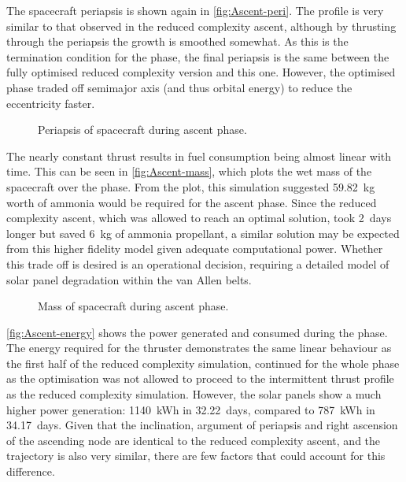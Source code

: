 The spacecraft periapsis is shown again in \autoref{fig:Ascent-peri}. The profile is very similar to that observed in the reduced complexity ascent, although by thrusting through the periapsis the growth is smoothed somewhat. As this is the termination condition for the phase, the final periapsis is the same between the fully optimised reduced complexity version and this one. However, the optimised phase traded off semimajor axis (and thus orbital energy) to reduce the eccentricity faster. 

\begin{figure}
\caption{Periapsis of spacecraft during ascent phase.}
\label{fig:Ascent-peri}
\centering
\def\svgwidth{\figurewidth}

\end{figure}

The nearly constant thrust results in fuel consumption being almost linear with time. This can be seen in \autoref{fig:Ascent-mass}, which plots the wet mass of the spacecraft over the phase. From the plot, this simulation suggested 59.82~kg worth of ammonia would be required for the ascent phase. %
Since the reduced complexity ascent, which was allowed to reach an optimal solution, took 2~days longer but saved 6~kg of ammonia propellant, a similar solution may be expected from this higher fidelity model given adequate computational power. Whether this trade off is desired is an operational decision, requiring a detailed model of solar panel degradation within the van Allen belts.

\begin{figure}
\caption{Mass of spacecraft during ascent phase.}
\label{fig:Ascent-mass}
\centering
\def\svgwidth{\figurewidth}

\end{figure}

\autoref{fig:Ascent-energy} shows the power generated and consumed during the phase. The energy required for the thruster demonstrates the same linear behaviour as the first half of the reduced complexity simulation, continued for the whole phase as the optimisation was not allowed to proceed to the intermittent thrust profile as the reduced complexity simulation. However, the solar panels show a much higher power generation: 1140~kWh in 32.22~days, compared to 787~kWh in 34.17~days. Given that the inclination, argument of periapsis and right ascension of the ascending node are identical to the reduced complexity ascent, and the trajectory is also very similar, there are few factors that could account for this difference. 

